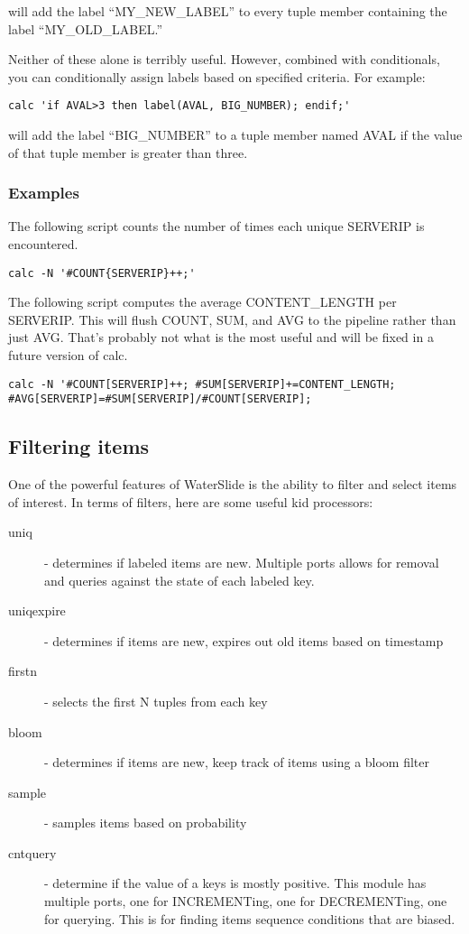 \documentclass[11pt]{article}
\begin{document}
will add the label ``MY\_NEW\_LABEL'' to every tuple member containing the label ``MY\_OLD\_LABEL.''

Neither of these alone is terribly useful.  However, combined with conditionals, you can
conditionally assign labels based on specified criteria.  For example:

\begin{lstlisting}
calc 'if AVAL>3 then label(AVAL, BIG_NUMBER); endif;'
\end{lstlisting}

will add the label ``BIG\_NUMBER'' to a tuple member named AVAL if the
value of that tuple member is greater than three.

\subsubsection {Examples}

The following script counts the number of times each unique SERVERIP is encountered.

\begin{lstlisting}
calc -N '#COUNT{SERVERIP}++;'
\end{lstlisting}

The following script computes the average CONTENT\_LENGTH per SERVERIP.  This will flush COUNT, 
SUM, and AVG to the pipeline rather than just AVG.  That's probably not what
is the most useful and will be fixed in a future version of calc.

\begin{lstlisting}
calc -N '#COUNT[SERVERIP]++; #SUM[SERVERIP]+=CONTENT_LENGTH; 
#AVG[SERVERIP]=#SUM[SERVERIP]/#COUNT[SERVERIP];
\end{lstlisting}

\subsection {Filtering items}
One of the powerful features of WaterSlide is the ability to filter and select items of interest.  In
terms of filters, here are some useful kid processors: 
\begin{description}
\item [uniq] - determines if labeled items are new.  Multiple ports allows for removal and queries against
the state of each labeled key.
\item [uniqexpire] - determines if items are new, expires out old items based on timestamp 
\item [firstn] - selects the first N tuples from each key
\item [bloom] - determines if items are new, keep track of items using a bloom filter
\item [sample] - samples items based on probability
\item [cntquery] - determine if the value of a keys is mostly positive.  This module has multiple ports, one
for INCREMENTing, one for DECREMENTing, one for querying.  This is for finding items sequence
conditions that are biased.
\end{description}
\end{document}
